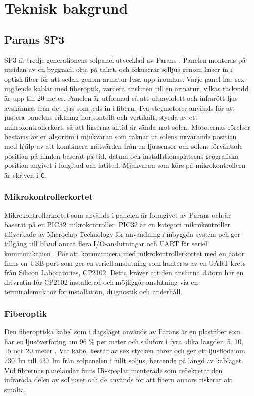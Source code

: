 \section{Teknisk bakgrund} %
\label{sec:teknisk_bakgrund}
    \subsection{Parans SP3} %
    \label{sub:parans_sp3}
        SP3 är tredje generationens solpanel utvecklad av Parans \cite{parans_manual}. Panelen monteras på utsidan av en byggnad, ofta på taket, och fokuserar solljus genom linser in i optisk fiber för att sedan genom armatur lysa upp inomhus. Varje panel har sex utgående kablar med fiberoptik, vardera ansluten till en armatur, vilkas räckvidd är upp till 20 meter. Panelen är utformad så att ultraviolett och infrarött ljus avskärmas från det ljus som leds in i fibern. Två stegmotorer används för att justera panelens riktning horisontellt och vertikalt, styrda av ett mikrokontrollerkort, så att linserna alltid är vända mot solen. Motorernas rörelser bestäms av en algoritm i mjukvaran som räknar ut solens nuvarande position med hjälp av att kombinera mätvärden från en ljussensor och solens förväntade position på himlen baserat på tid, datum och installationsplatsens geografiska position angivet i longitud och latitud. Mjukvaran som körs på mikrokontrollern är skriven i \texttt{C}.

        \subsubsection{Mikrokontrollerkortet} %
        \label{ssub:mikrokontrollerkortet}
            Mikrokontrollerkortet som används i panelen är formgivet av Parans och är baserat på en PIC32 mikrokontroller. PIC32 är en kategori mikrokontroller tillverkade av Microchip Technology för användning i inbyggda system och ger tillgång till bland annat flera I/O-anslutningar och UART för seriell kommunikation \cite[s.~42--44]{PIC32}. För att kommunicera med mikrokontrollerkortet med en dator finns en USB-port som ger en seriell anslutning som hanteras av en UART-krets från Silicon Laboratories, CP2102. Detta kräver att den anslutna datorn har en drivrutin för CP2102 installerad och möjliggör anslutning via en terminalemulator för installation, diagnostik och underhåll.

        \subsubsection{Fiberoptik} %
        \label{ssub:fiberoptik}
            Den fiberoptiska kabel som i dagsläget används av Parans är en plastfiber som har en ljusöverföring om 96 \% per meter och saluförs i fyra olika längder, 5, 10, 15 och 20 meter \cite{parans_spec}. Var kabel består av sex stycken fibrer och ger ett ljusflöde om 730~lm till 430~lm från solpanelen i fullt soljus, beroende på längd av kablaget. Vid fibrernas paneländar finns IR-speglar monterade som reflekterar den infraröda delen av solljuset och de används för att fibern annars riskerar att smälta.

